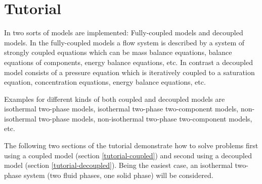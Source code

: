 \chapter[Tutorial]{Tutorial}\label{chp:tutorial}

In \Dumux two sorts of models are implemented: Fully-coupled models and decoupled models. In the fully-coupled models a flow system is described by a system of strongly coupled equations which can be mass balance equations, balance equations of components, energy balance equations, etc. In contrast a decoupled model consists of a pressure equation which is iteratively coupled to a saturation equation, concentration equations, energy balance equations, etc.

Examples for different kinds of both coupled and decoupled models are isothermal two-phase models, isothermal two-phase two-component models, non-isothermal two-phase models, non-isothermal two-phase two-component models, etc.

The following two sections of the tutorial demonstrate how to solve problems first using a coupled model (section \ref{tutorial-coupled}) and second using a decoupled model (section \ref{tutorial-decoupled}). Being the easiest case, an isothermal two-phase system (two fluid phases, one solid phase) will be considered.


%
